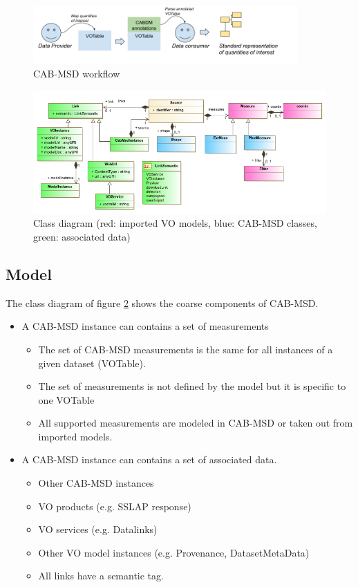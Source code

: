 \documentclass[11pt,a4paper]{ivoa}
\begin{document}
\begin{figure}
\centering
\includegraphics[width=0.9\textwidth]{fig1.png}
\caption{CAB-MSD workflow}
\label{fig:workflow}
\end{figure}

\begin{figure}
\centering
\includegraphics[width=1.0\textwidth]{CABSDM_diagram.png}
\caption{Class diagram (red: imported VO models, blue: CAB-MSD classes, green: associated data)}
\label{fig:classdiag}
\end{figure}

\subsection{Model}

The class diagram of figure \ref{fig:classdiag} shows the coarse components of CAB-MSD. 

\begin{itemize}
    \item A CAB-MSD instance can contains a set of measurements
    \begin{itemize}
        \item The set of CAB-MSD measurements is the same for all instances of a given dataset (VOTable).
        \item The set of measurements is not defined by the model but it is specific to one VOTable
        \item All supported measurements are modeled in CAB-MSD or taken out from imported models.
    \end{itemize}
\item A CAB-MSD instance can contains a set of associated data.
    \begin{itemize}
        \item Other CAB-MSD instances
        \item VO products (e.g. SSLAP response)
        \item VO services (e.g. Datalinks)
        \item Other VO model instances (e.g. Provenance, DatasetMetaData)
        \item All links have a semantic tag.
    \end{itemize}
\end{itemize}
\end{document}
